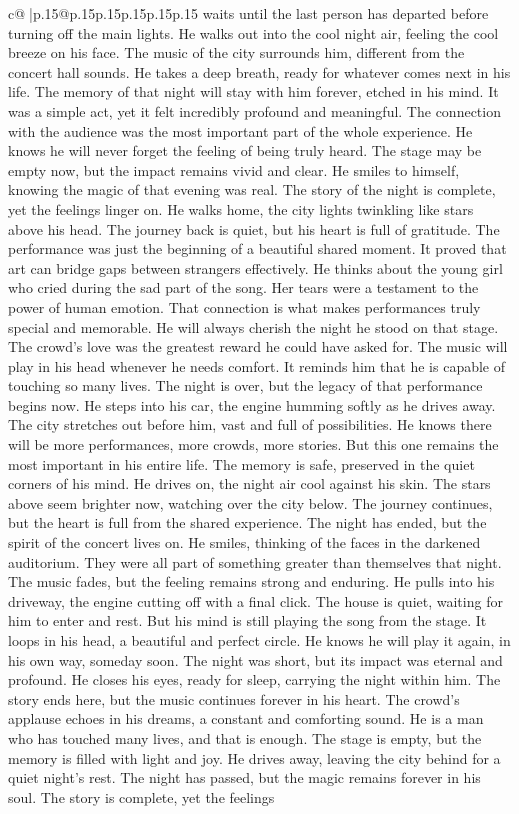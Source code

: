 \documentclass{article}
\begin{document}
{\begin{supertabular}{c@{$\;$}|p{.15\linewidth}@{}p{.15\linewidth}p{.15\linewidth}p{.15\linewidth}p{.15\linewidth}p{.15\linewidth}}
{{{waits until the last person has departed before turning off the main lights. He walks out into the cool night air, feeling the cool breeze on his face. The music of the city surrounds him, different from the concert hall sounds. He takes a deep breath, ready for whatever comes next in his life. The memory of that night will stay with him forever, etched in his mind. It was a simple act, yet it felt incredibly profound and meaningful. The connection with the audience was the most important part of the whole experience. He knows he will never forget the feeling of being truly heard. The stage may be empty now, but the impact remains vivid and clear. He smiles to himself, knowing the magic of that evening was real. The story of the night is complete, yet the feelings linger on. He walks home, the city lights twinkling like stars above his head. The journey back is quiet, but his heart is full of gratitude. The performance was just the beginning of a beautiful shared moment. It proved that art can bridge gaps between strangers effectively. He thinks about the young girl who cried during the sad part of the song. Her tears were a testament to the power of human emotion. That connection is what makes performances truly special and memorable. He will always cherish the night he stood on that stage. The crowd's love was the greatest reward he could have asked for. The music will play in his head whenever he needs comfort. It reminds him that he is capable of touching so many lives. The night is over, but the legacy of that performance begins now. He steps into his car, the engine humming softly as he drives away. The city stretches out before him, vast and full of possibilities. He knows there will be more performances, more crowds, more stories. But this one remains the most important in his entire life. The memory is safe, preserved in the quiet corners of his mind. He drives on, the night air cool against his skin. The stars above seem brighter now, watching over the city below. The journey continues, but the heart is full from the shared experience. The night has ended, but the spirit of the concert lives on. He smiles, thinking of the faces in the darkened auditorium. They were all part of something greater than themselves that night. The music fades, but the feeling remains strong and enduring. He pulls into his driveway, the engine cutting off with a final click. The house is quiet, waiting for him to enter and rest. But his mind is still playing the song from the stage. It loops in his head, a beautiful and perfect circle. He knows he will play it again, in his own way, someday soon. The night was short, but its impact was eternal and profound. He closes his eyes, ready for sleep, carrying the night within him. The story ends here, but the music continues forever in his heart. The crowd's applause echoes in his dreams, a constant and comforting sound. He is a man who has touched many lives, and that is enough. The stage is empty, but the memory is filled with light and joy. He drives away, leaving the city behind for a quiet night's rest. The night has passed, but the magic remains forever in his soul. The story is complete, yet the feelings }}}
\end{supertabular}}
\end{document}

